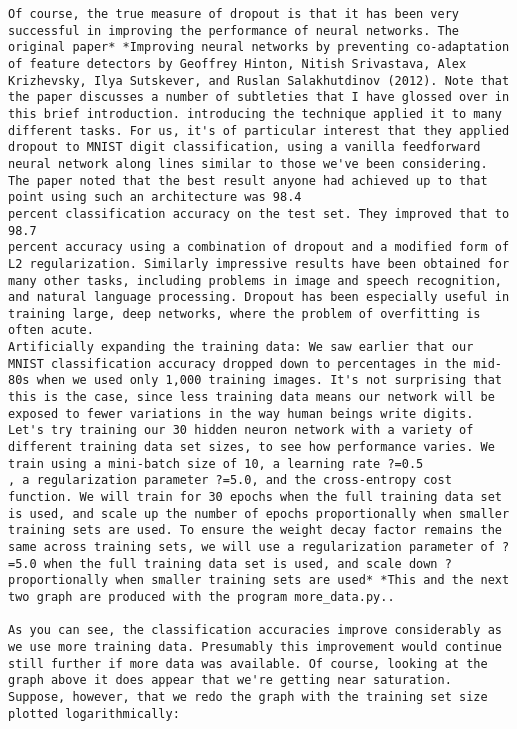 \begin{lstlisting}
Of course, the true measure of dropout is that it has been very successful in improving the performance of neural networks. The original paper* *Improving neural networks by preventing co-adaptation of feature detectors by Geoffrey Hinton, Nitish Srivastava, Alex Krizhevsky, Ilya Sutskever, and Ruslan Salakhutdinov (2012). Note that the paper discusses a number of subtleties that I have glossed over in this brief introduction. introducing the technique applied it to many different tasks. For us, it's of particular interest that they applied dropout to MNIST digit classification, using a vanilla feedforward neural network along lines similar to those we've been considering. The paper noted that the best result anyone had achieved up to that point using such an architecture was 98.4
percent classification accuracy on the test set. They improved that to 98.7
percent accuracy using a combination of dropout and a modified form of L2 regularization. Similarly impressive results have been obtained for many other tasks, including problems in image and speech recognition, and natural language processing. Dropout has been especially useful in training large, deep networks, where the problem of overfitting is often acute.
Artificially expanding the training data: We saw earlier that our MNIST classification accuracy dropped down to percentages in the mid-80s when we used only 1,000 training images. It's not surprising that this is the case, since less training data means our network will be exposed to fewer variations in the way human beings write digits. Let's try training our 30 hidden neuron network with a variety of different training data set sizes, to see how performance varies. We train using a mini-batch size of 10, a learning rate ?=0.5
, a regularization parameter ?=5.0, and the cross-entropy cost function. We will train for 30 epochs when the full training data set is used, and scale up the number of epochs proportionally when smaller training sets are used. To ensure the weight decay factor remains the same across training sets, we will use a regularization parameter of ?=5.0 when the full training data set is used, and scale down ?
proportionally when smaller training sets are used* *This and the next two graph are produced with the program more_data.py..

As you can see, the classification accuracies improve considerably as we use more training data. Presumably this improvement would continue still further if more data was available. Of course, looking at the graph above it does appear that we're getting near saturation. Suppose, however, that we redo the graph with the training set size plotted logarithmically:


\end{lstlisting}
